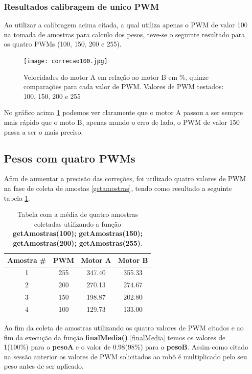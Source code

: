 \documentclass[a4paper,12pt,portuguese]{ufms-cpcx}
\begin{document}
\subsubsection{Resultados calibragem de unico PWM}
Ao utilizar a calibragem acima citada, a qual utiliza apenas o PWM de valor 100 na tomada de amostras para calculo dos pesos, teve-se o seguinte resultado para os quatro PWMs (100, 150, 200 e 255).
\begin{figure}[H]	
	\centering
	\texttt{[image: correcao100.jpg]}
	\caption{Velocidades do motor A em relação ao motor B em \%, quinze comparações para cada valor de PWM. Valores de PWM testados: 100, 150, 200 e 255}
	\label{fig:correcao100}
\end{figure}
No gráfico acima \ref{fig:correcao100} podemos ver claramente que o motor A passou a ser sempre mais rápido que o moto B, apenas mundo o erro de lado, o PWM de valor 150 passa a ser o mais preciso.

\subsection{Pesos com quatro PWMs} \label{calibmult}
Afim de aumentar a precisão das correções, foi utilizado quatro valores de PWM na fase de coleta de amostas \ref{getamostras}, tendo como resultado a seguinte tabela \ref{Tab:calibMC}.
\begin{table}[!h]
	\renewcommand{\arraystretch}{1.3}
	\centering
	\begin{tabular}{|c|c|cc|}
		\hline
		Amostra \# & PWM & Motor A & Motor B \\ \hline
		    1      & 255 & 347.40  & 355.33  \\
		    2      & 200 & 270.13  & 274.67  \\
		    3      & 150 & 198.87  & 202.80  \\
		    4      & 100 & 129.73  & 133.00  \\ \hline
	\end{tabular}
	\caption[Tabela de amotas PWM 100]{Tabela com a média de quatro amostras coletadas utilizando a função \textbf{getAmostras(100); getAmostras(150); getAmostras(200); getAmostras(255)}.}
	\label{Tab:calibMC}
\end{table}
Ao fim da coleta de amostras utilizando os quatro valores de PWM citados e ao fim da execução da função \textbf{finalMedia()} \ref{finalMedia} temos os valores de 1(100\%) para o \textbf{pesoA} e o valor de 0.98(98\%) para o \textbf{pesoB}. Assim como citado na sessão anterior os valores de PWM solicitados ao robô é multiplicado pelo seu peso antes de ser aplicado.
\end{document}
